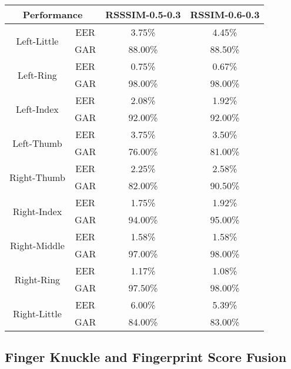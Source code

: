 \begin{table}[ht]
    \centering
    \begin{tabular}{cccc}
    \hline
    \multicolumn{2}{c}{Performance}     & RSSSIM-0.5-0.3 & RSSIM-0.6-0.3 \\ \hline
    \multirow{2}{*}{Left-Little}  & EER & 3.75\%         & 4.45\%        \\
                                  & GAR & 88.00\%        & 88.50\%       \\ \hline
    \multirow{2}{*}{Left-Ring}    & EER & 0.75\%         & 0.67\%        \\
                                  & GAR & 98.00\%        & 98.00\%       \\ \hline
    \multirow{2}{*}{Left-Index}   & EER & 2.08\%         & 1.92\%        \\
                                  & GAR & 92.00\%        & 92.00\%       \\ \hline
    \multirow{2}{*}{Left-Thumb}   & EER & 3.75\%         & 3.50\%        \\
                                  & GAR & 76.00\%        & 81.00\%       \\ \hline
    \multirow{2}{*}{Right-Thumb}  & EER & 2.25\%         & 2.58\%        \\
                                  & GAR & 82.00\%        & 90.50\%       \\ \hline
    \multirow{2}{*}{Right-Index}  & EER & 1.75\%         & 1.92\%        \\
                                  & GAR & 94.00\%        & 95.00\%       \\ \hline
    \multirow{2}{*}{Right-Middle} & EER & 1.58\%         & 1.58\%        \\
                                  & GAR & 97.00\%        & 98.00\%       \\ \hline
    \multirow{2}{*}{Right-Ring}   & EER & 1.17\%         & 1.08\%        \\
                                  & GAR & 97.50\%        & 98.00\%       \\ \hline
    \multirow{2}{*}{Right-Little} & EER & 6.00\%         & 5.39\%        \\
                                  & GAR & 84.00\%        & 83.00\%       \\ \hline
    \end{tabular}
\end{table}

\subsection{Finger Knuckle and Fingerprint Score Fusion}

